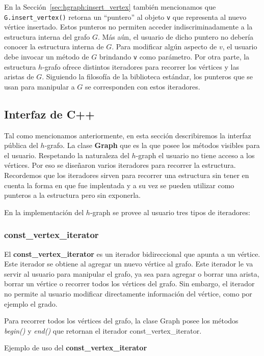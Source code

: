 \documentclass[a4paper,12pt]{article}
\begin{document}
En la Sección~\ref{sec:hgraph:insert_vertex} también mencionamos que \texttt{G.insert\_vertex()} retorna un ``puntero'' al objeto \texttt{v} que representa al nuevo vértice insertado.  Estos punteros no permiten acceder indiscriminadamente a la estructura interna del grafo $G$.  Más aún, el usuario de dicho puntero no debería conocer la estructura interna de $G$.  Para modificar algún aspecto de $v$, el usuario debe invocar un método de $G$ brindando \texttt{v} como parámetro.  Por otra parte, la estructura $h$-grafo ofrece distintos iteradores para recorrer los vértices y las aristas de $G$.  Siguiendo la filosofía de la biblioteca estándar, los punteros que se usan para manipular a $G$ se corresponden con estos iteradores.

\subsection{Interfaz de C++}
\label{sec:c++:interfaz}
Tal como mencionamos anteriormente, en esta sección describiremos la interfaz pública del $h$-grafo.
La clase \textbf{Graph} que es la que posee los métodos visibles para el usuario.
Respetando la naturaleza del $h$-graph el usuario no tiene acceso a los vértices. Por eso se diseñaron varios iteradores para recorrer la estructura.
Recordemos que los iteradores sirven para recorrer una estructura sin tener en cuenta la forma en que fue implentada y a su vez se pueden utilizar como punteros a la estructura pero sin exponerla.

En la implementación del $h$-graph se provee al usuario tres tipos de iteradores:

\subsubsection{const\_vertex\_iterator}
\label{sec:vertex iterator}
El \textbf{const\_vertex\_iterator} es un iterador bidireccional que apunta a un vértice. Este iterador se obtiene al agregar un nuevo vértice al grafo. Este iterador le va servir al usuario para manipular el grafo, ya sea para agregar o borrar una arista, borrar un vértice o recorrer todos los vértices del grafo. Sin embargo, el iterador no permite al usuario modificar directamente información del vértice, como por ejemplo el grado.

Para recorrer todos los vértices del grafo, la clase Graph posee los métodos \textit{begin()} y \textit{end()} que retornan el iterador const\_vertex\_iterator.

Ejemplo de uso del \textbf{const\_vertex\_iterator}
\end{document}
